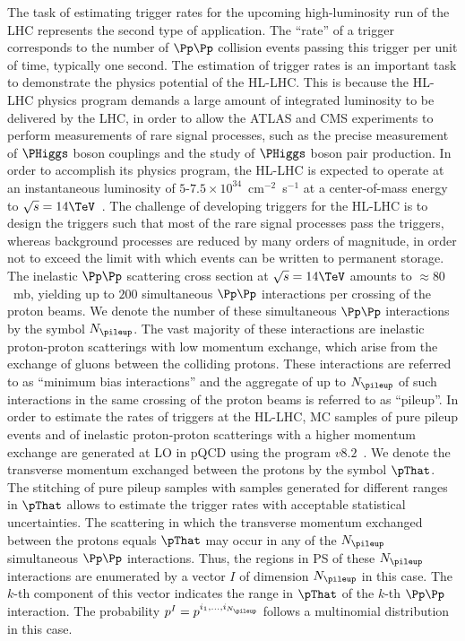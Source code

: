 The task of estimating trigger rates for the upcoming high-luminosity run of the LHC represents the second type of application.
The ``rate'' of a trigger corresponds to the number of $\Pp\Pp$ collision events passing this trigger per unit of time, typically one second.
The estimation of trigger rates is an important task to demonstrate the physics potential of the HL-LHC.
This is because the HL-LHC physics program demands a large amount of integrated luminosity to be delivered by the LHC,
in order to allow the ATLAS and CMS experiments to perform measurements of rare signal processes,
such as the precise measurement of $\PHiggs$ boson couplings and the study of $\PHiggs$ boson pair production.
In order to accomplish its physics program, the HL-LHC is expected to operate at an instantaneous luminosity of $5$-$7.5 \times 10^{34}$~cm$^{-2}$~s$^{-1}$
at a center-of-mass energy to $\sqrt{s} = 14\TeV$~\cite{TDR_Phase2_lhc}.
The challenge of developing triggers for the HL-LHC is to design the triggers such that most of the rare signal processes pass the triggers,
whereas background processes are reduced by many orders of magnitude, in order not to exceed the limit with which events can be written to permanent storage.
The inelastic $\Pp\Pp$ scattering cross section at $\sqrt{s} = 14\TeV$ amounts to $\approx 80$~mb,
yielding up to $200$ simultaneous $\Pp\Pp$ interactions per crossing of the proton beams. 
We denote the number of these simultaneous $\Pp\Pp$ interactions by the symbol $N_{\pileup}$.
The vast majority of these interactions are inelastic proton-proton scatterings with low momentum exchange,
which arise from the exchange of gluons between the colliding protons.
These interactions are referred to as ``minimum bias interactions'' and the aggregate of up to $N_{\pileup}$ of such interactions in the same crossing of the proton beams is referred to as ``pileup''.
In order to estimate the rates of triggers at the HL-LHC,
MC samples of pure pileup events and of inelastic proton-proton scatterings with a higher momentum exchange are generated at LO in pQCD
using the program \PYTHIA $v8.2$~\cite{Sjostrand:2014zea}.
We denote the transverse momentum exchanged between the protons by the symbol $\pThat$.
The stitching of pure pileup samples with samples generated for different ranges in $\pThat$ allows to estimate the trigger rates with acceptable statistical uncertainties.
The scattering in which the transverse momentum exchanged between the protons equals $\pThat$ may occur in any of the $N_{\pileup}$ simultaneous $\Pp\Pp$ interactions.
Thus, the regions in PS of these $N_{\pileup}$ interactions are enumerated by a vector $I$ of dimension $N_{\pileup}$ in this case.
The $k$-th component of this vector indicates the range in $\pThat$ of the $k$-th $\Pp\Pp$ interaction.
The probability $p^{I} = p^{i_{1},\dots,i_{N_{\pileup}}}$ follows a multinomial distribution in this case.

